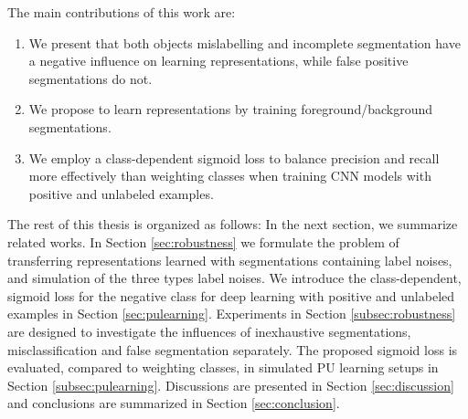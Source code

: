 



The main contributions of this work are:
\begin{enumerate}
  \item We present that both objects mislabelling and incomplete segmentation have a negative influence on learning representations, while false positive segmentations do not.
  \item We propose to learn representations by training foreground/background segmentations.
  \item We employ a class-dependent sigmoid loss to balance precision and recall more effectively than weighting classes when training CNN models with positive and unlabeled examples.
\end{enumerate}


The rest of this thesis is organized as follows:
In the next section, we summarize related works.
In Section \ref{sec:robustness} we formulate the problem of transferring representations learned with segmentations containing label noises, and simulation of the three types label noises.
We introduce the class-dependent, sigmoid loss for the negative class for deep learning with positive and unlabeled examples in Section \ref{sec:pulearning}.
Experiments in Section \ref{subsec:robustness} are designed to investigate the influences of inexhaustive segmentations, misclassification and false segmentation separately.
The proposed sigmoid loss is evaluated, compared to weighting classes, in simulated PU learning setups in Section \ref{subsec:pulearning}.
Discussions are presented in Section \ref{sec:discussion} and conclusions are summarized in Section \ref{sec:conclusion}.
